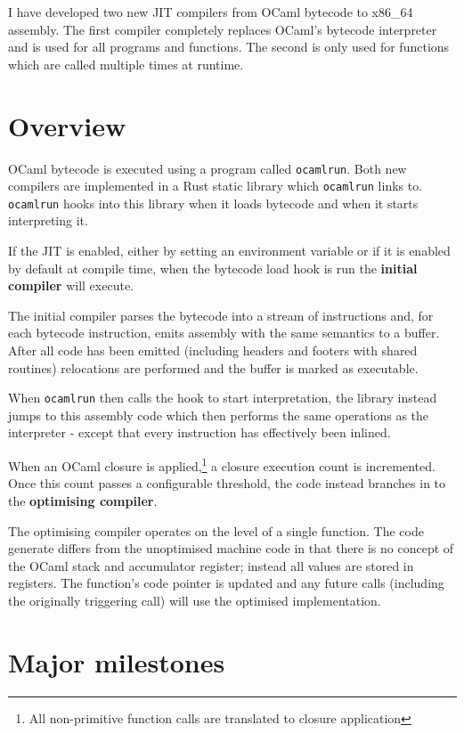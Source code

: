 I have developed two new JIT compilers from OCaml bytecode to x86\_64 assembly. The first compiler
completely replaces OCaml's bytecode interpreter and
is used for all programs and functions. The second is only used for functions which are called
multiple times at runtime.

\section{Overview}

OCaml bytecode is executed using a program called \texttt{ocamlrun}. Both new compilers are
implemented in a Rust static library which \texttt{ocamlrun} links to. \texttt{ocamlrun} hooks into
this library when it loads bytecode and when it starts interpreting it.

If the JIT is enabled, either by setting an environment variable or if it is enabled by default at
compile time, when the bytecode load hook is run the \textbf{initial compiler} will execute.

The initial compiler parses the bytecode into a stream of instructions and, for each bytecode
instruction, emits assembly with the same semantics to a buffer. After all code has been emitted
(including headers and footers with shared routines) relocations are performed and the buffer is
marked as executable.

When \texttt{ocamlrun} then calls the hook to start interpretation, the library instead jumps to
this assembly code which then performs the same operations as the interpreter - except that every
instruction has effectively been inlined.

When an OCaml closure is applied,\footnote{All non-primitive function calls are translated to
      closure application} a closure execution count is incremented. Once this count passes a
configurable
threshold, the code instead branches in to the \textbf{optimising compiler}.

The optimising compiler operates on the level of a single function. The code generate differs from
the unoptimised machine code in that there is no concept of the OCaml stack and accumulator
register; instead all values are stored in registers. The function's code pointer is updated and
any
future calls (including the originally triggering call) will use the optimised implementation.

\section{Major milestones}

